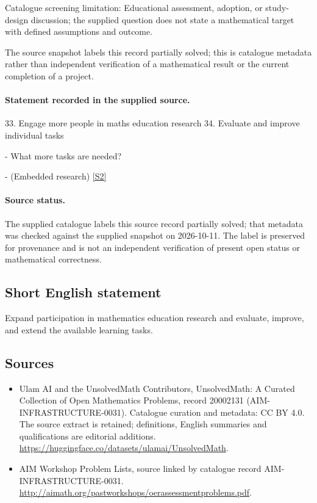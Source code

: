 \documentclass[11pt]{article}
\begin{document}
Catalogue screening limitation: Educational assessment, adoption, or study-design discussion; the supplied question does not state a mathematical target with defined assumptions and outcome.

The source snapshot labels this record partially solved; this is catalogue metadata rather than independent verification of a mathematical result or the current completion of a project.
\paragraph{Statement recorded in the supplied source.}
33. Engage more people in maths education research 34. Evaluate and improve individual tasks

- What more tasks are needed?

- (Embedded research) \href{http://aimath.org/pastworkshops/oerassessmentproblems.pdf}{[S2]}
\paragraph{Source status.}
The supplied catalogue labels this source record partially solved; that metadata was checked against the supplied snapshot on 2026-10-11. The label is preserved for provenance and is not an independent verification of present open status or mathematical correctness.
\subsection{Short English statement}
Expand participation in mathematics education research and evaluate, improve, and extend the available learning tasks.
\subsection{Sources}
\begin{itemize}
\item[S1] Ulam AI and the UnsolvedMath Contributors, UnsolvedMath: A Curated Collection of Open Mathematics Problems, record 20002131 (AIM-INFRASTRUCTURE-0031). Catalogue curation and metadata: CC BY 4.0. The source extract is retained; definitions, English summaries and qualifications are editorial additions.
\url{https://huggingface.co/datasets/ulamai/UnsolvedMath}.
\item[S2] AIM Workshop Problem Lists, source linked by catalogue record AIM-INFRASTRUCTURE-0031.
\url{http://aimath.org/pastworkshops/oerassessmentproblems.pdf}.
\end{itemize}
\end{document}
